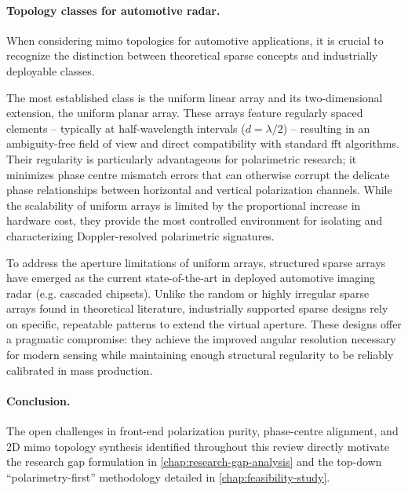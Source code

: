 \paragraph{Topology classes for automotive radar.}
When considering \gls{mimo} topologies for automotive applications, it is crucial to recognize the distinction between theoretical sparse concepts and industrially deployable classes.

The most established class is the uniform linear array and its two-dimensional extension, the uniform planar array.
These arrays feature regularly spaced elements -- typically at half-wavelength intervals ($d=\lambda/2$) -- resulting in an ambiguity-free field of view and direct compatibility with standard \gls{fft} algorithms.
Their regularity is particularly advantageous for polarimetric research; it minimizes phase centre mismatch errors that can otherwise corrupt the delicate phase relationships between horizontal and vertical polarization channels.
While the scalability of uniform arrays is limited by the proportional increase in hardware cost, they provide the most controlled environment for isolating and characterizing Doppler-resolved polarimetric signatures.

To address the aperture limitations of uniform arrays, structured sparse arrays have emerged as the current state-of-the-art in deployed automotive imaging radar (e.g. cascaded chipsets).
Unlike the random or highly irregular sparse arrays found in theoretical literature, industrially supported sparse designs rely on specific, repeatable patterns to extend the virtual aperture.
These designs offer a pragmatic compromise: they achieve the improved angular resolution necessary for modern sensing while maintaining enough structural regularity to be reliably calibrated in mass production.

\paragraph{Conclusion.}
The open challenges in front-end polarization purity, phase-centre alignment, and 2D \gls{mimo} topology synthesis identified throughout this review directly motivate the research gap formulation in \cref{chap:research-gap-analysis} and the top-down \enquote{polarimetry-first} methodology detailed in \cref{chap:feasibility-study}.

